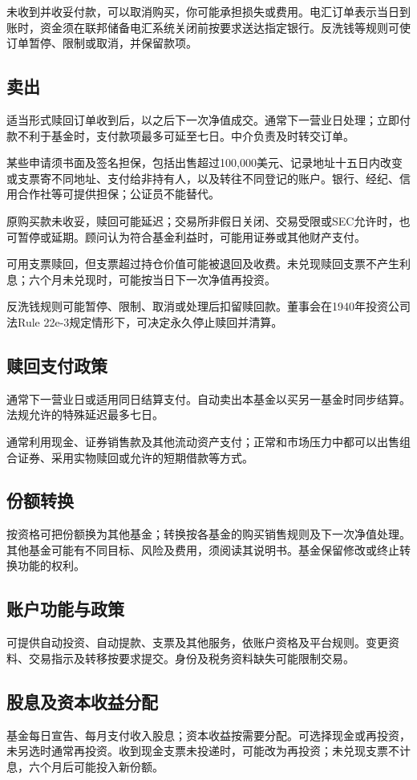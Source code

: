 \documentclass[UTF8,fontset=none,11pt,a4paper]{ctexart}
\begin{document}
未收到并收妥付款，可以取消购买，你可能承担损失或费用。电汇订单表示当日到账时，资金须在联邦储备电汇系统关闭前按要求送达指定银行。反洗钱等规则可使订单暂停、限制或取消，并保留款项。


\subsection*{卖出}
适当形式赎回订单收到后，以之后下一次净值成交。通常下一营业日处理；立即付款不利于基金时，支付款项最多可延至七日。中介负责及时转交订单。


某些申请须书面及签名担保，包括出售超过100,000美元、记录地址十五日内改变或支票寄不同地址、支付给非持有人，以及转往不同登记的账户。银行、经纪、信用合作社等可提供担保；公证员不能替代。


原购买款未收妥，赎回可能延迟；交易所非假日关闭、交易受限或SEC允许时，也可暂停或延期。顾问认为符合基金利益时，可能用证券或其他财产支付。


可用支票赎回，但支票超过持仓价值可能被退回及收费。未兑现赎回支票不产生利息；六个月未兑现时，可能按当日下一次净值再投资。


反洗钱规则可能暂停、限制、取消或处理后扣留赎回款。董事会在1940年投资公司法Rule 22e-3规定情形下，可决定永久停止赎回并清算。


\subsection*{赎回支付政策}
通常下一营业日或适用同日结算支付。自动卖出本基金以买另一基金时同步结算。法规允许的特殊延迟最多七日。


通常利用现金、证券销售款及其他流动资产支付；正常和市场压力中都可以出售组合证券、采用实物赎回或允许的短期借款等方式。


\subsection*{份额转换}
按资格可把份额换为其他基金；转换按各基金的购买销售规则及下一次净值处理。其他基金可能有不同目标、风险及费用，须阅读其说明书。基金保留修改或终止转换功能的权利。


\subsection*{账户功能与政策}
可提供自动投资、自动提款、支票及其他服务，依账户资格及平台规则。变更资料、交易指示及转移按要求提交。身份及税务资料缺失可能限制交易。


\subsection*{股息及资本收益分配}
基金每日宣告、每月支付收入股息；资本收益按需要分配。可选择现金或再投资，未另选时通常再投资。收到现金支票未投递时，可能改为再投资；未兑现支票不计息，六个月后可能投入新份额。
\end{document}
